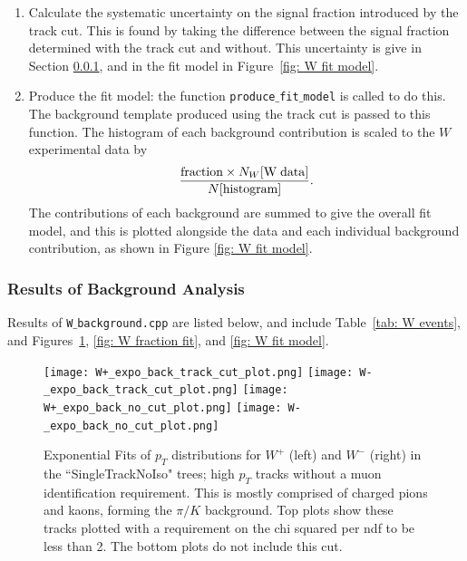 \documentclass[a4paper]{article}
\begin{document}
\begin{enumerate}
    \item Calculate the systematic uncertainty on the signal fraction introduced by the track cut. This is found by taking the difference between the signal fraction determined with the track cut and without. This uncertainty is give in Section \ref{sec: W background results}, and in the fit model in Figure~\ref{fig: W fit model}.

    \item Produce the fit model: the function \texttt{produce$\_$fit$\_$model} is called to do this. The background template produced using the track cut is passed to this function. The histogram of each background contribution is scaled to the $W$ experimental data by
    \begin{equation}
        \frac{{\rm fraction} \times N_W[{\rm W \; data}]}{N[{\rm histogram}]}.
    \end{equation}
    The contributions of each background are summed to give the overall fit model, and this is plotted alongside the data and each individual background contribution, as shown in Figure \ref{fig: W fit model}.
\end{enumerate}




\subsubsection{Results of Background Analysis} \label{sec: W background results}
Results of \texttt{W$\_$background.cpp} are listed below, and include Table~\ref{tab: W events}, and Figures~\ref{fig: W exp back fit}, \ref{fig: W fraction fit}, and \ref{fig: W fit model}.

\begin{figure}[ht]
  \centering
  \texttt{[image: W+\_expo\_back\_track\_cut\_plot.png]}
  \texttt{[image: W-\_expo\_back\_track\_cut\_plot.png]}
  \texttt{[image: W+\_expo\_back\_no\_cut\_plot.png]}
  \texttt{[image: W-\_expo\_back\_no\_cut\_plot.png]} \hspace{3mm}
  \vspace{-4mm}
  \caption{\small Exponential Fits of $p_T$ distributions for $W^+$ (left) and $W^-$ (right) in the ``SingleTrackNoIso" trees; high $p_T$ tracks without a muon identification requirement. This is mostly comprised of charged pions and kaons, forming the $\pi/K$ background. Top plots show these tracks plotted with a requirement on the chi squared per ndf to be less than 2. The bottom plots do not include this cut.}
  \label{fig: W exp back fit}
\end{figure}
\end{document}
